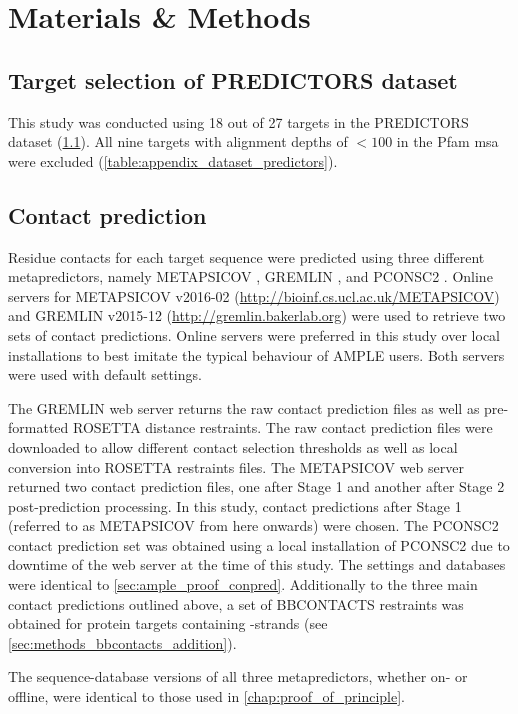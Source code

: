 \section{Materials \& Methods}
\subsection{Target selection of PREDICTORS dataset} \label{sec:methods_dataset_predictors}
This study was conducted using 18 out of 27 targets in the PREDICTORS dataset (\cref{sec:methods_dataset_predictors}). All nine targets with alignment depths of $<100$ in the Pfam \gls{msa} were excluded (\cref{table:appendix_dataset_predictors}).

\subsection{Contact prediction}
Residue contacts for each target sequence were predicted using three different metapredictors, namely METAPSICOV \cite{Jones2015-vq}, GREMLIN \cite{Kamisetty2013-le}, and PCONSC2 \cite{Skwark2014-qp}. Online servers for METAPSICOV v2016-02 (\url{http://bioinf.cs.ucl.ac.uk/METAPSICOV}) and GREMLIN v2015-12 (\url{http://gremlin.bakerlab.org}) were used to retrieve two sets of contact predictions. Online servers were preferred in this study over local installations to best imitate the typical behaviour of AMPLE users. Both servers were used with default settings.

The GREMLIN web server returns the raw contact prediction files as well as pre-formatted ROSETTA distance restraints. The raw contact prediction files were downloaded to allow different contact selection thresholds as well as local conversion into ROSETTA restraints files. The METAPSICOV web server returned two contact prediction files, one after Stage 1 and another after Stage 2 post-prediction processing. In this study, contact predictions after Stage 1 (referred to as METAPSICOV from here onwards) were chosen. The PCONSC2 contact prediction set was obtained using a local installation of PCONSC2 due to downtime of the web server at the time of this study. The settings and databases were identical to \cref{sec:ample_proof_conpred}. Additionally to the three main contact predictions outlined above, a set of BBCONTACTS restraints was obtained for protein targets containing \textbeta-strands (see \cref{sec:methods_bbcontacts_addition}).

The sequence-database versions of all three metapredictors, whether on- or offline, were identical to those used in \cref{chap:proof_of_principle}.

